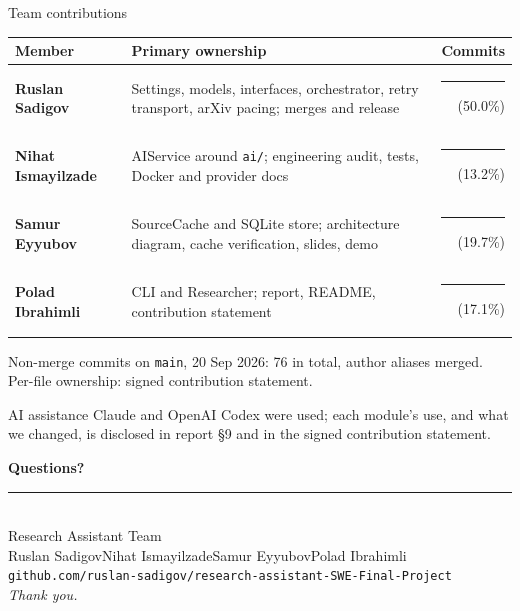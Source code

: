\documentclass[aspectratio=169,11pt]{beamer}
\newcommand{\teamname}{Research Assistant Team}
\newcommand{\memberone}{Ruslan Sadigov}
\newcommand{\membertwo}{Nihat Ismayilzade}
\newcommand{\memberthree}{Samur Eyyubov}
\newcommand{\memberfour}{Polad Ibrahimli}
\newcommand{\repolink}{github.com/ruslan-sadigov/research-assistant-SWE-Final-Project}
\newcommand{\commitdate}{20 Sep 2026}
\newcommand{\committotal}{76}
\newcommand{\cntone}{38}\newcommand{\pctone}{50.0}
\newcommand{\cnttwo}{10}\newcommand{\pcttwo}{13.2}
\newcommand{\cntthree}{15}\newcommand{\pctthree}{19.7}
\newcommand{\cntfour}{13}\newcommand{\pctfour}{17.1}
\newcommand{\sharebar}[1]{%
  \pgfmathsetlengthmacro{\barw}{#1*0.05cm}%
  {\color{accent}\rule{\barw}{5pt}}%
}
\begin{document}
\begin{frame}{Team contributions}
  \begin{center}\footnotesize
  \begin{tabularx}{\linewidth}{@{}>{\bfseries}lXr@{}}
    \toprule
    Member & Primary ownership & Commits \\
    \midrule
    \memberone   & Settings, models, interfaces, orchestrator, retry transport, arXiv pacing; merges and release & \sharebar{\pctone}\enspace\cntone\ (\pctone\%) \\[3pt]
    \membertwo   & AIService around \texttt{ai/}; engineering audit, tests, Docker and provider docs & \sharebar{\pcttwo}\enspace\cnttwo\ (\pcttwo\%) \\[3pt]
    \memberthree & SourceCache and SQLite store; architecture diagram, cache verification, slides, demo & \sharebar{\pctthree}\enspace\cntthree\ (\pctthree\%) \\[3pt]
    \memberfour  & CLI and Researcher; report, README, contribution statement & \sharebar{\pctfour}\enspace\cntfour\ (\pctfour\%) \\
    \bottomrule
  \end{tabularx}
  \end{center}
  \vspace{-0.3em}
  {\scriptsize Non-merge commits on \texttt{main}, \commitdate{}: \committotal{} in total, author aliases merged.
  Per-file ownership: signed contribution statement.}

  \vspace{0.6em}
  \begin{block}{AI assistance}
    \small Claude and OpenAI Codex were used; each module's use, and what we changed, is
    disclosed in report \S9 and in the signed contribution statement.
  \end{block}
\end{frame}

{%
\begin{frame}[plain]
  \begin{center}
    \vspace{1cm}
    {\Huge\bfseries\color{accent} Questions?}\\[1.2em]
    \rule{0.5\textwidth}{0.6pt}\\[1.2em]
    {\large \teamname}\\[0.6em]
    {\normalsize \memberone\quad\textbullet\quad\membertwo\quad\textbullet\quad\memberthree\quad\textbullet\quad\memberfour}\\[0.8em]
    {\small \texttt{\repolink}}\\[1cm]
    {\footnotesize\itshape Thank you.}
  \end{center}
\end{frame}
}
\end{document}
